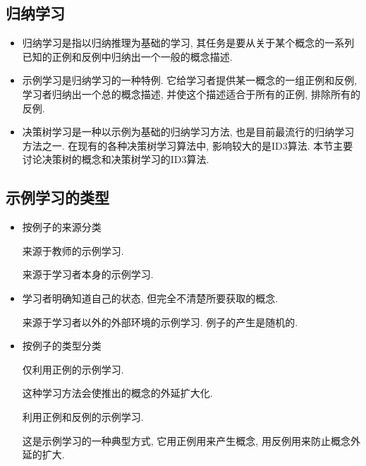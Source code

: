 \subsection{归纳学习}
\begin{itemize}
\item 归纳学习是指以归纳推理为基础的学习, 其任务是要从关于某个概念的一系列已知的正例和反例中归纳出一个一般的概念描述.
\item 示例学习是归纳学习的一种特例. 它给学习者提供某一概念的一组正例和反例, 学习者归纳出一个总的概念描述, 并使这个描述适合于所有的正例, 排除所有的反例.
\item 决策树学习是一种以示例为基础的归纳学习方法, 也是目前最流行的归纳学习方法之一. 在现有的各种决策树学习算法中, 影响较大的是ID3算法. 本节主要讨论决策树的概念和决策树学习的ID3算法.
\end{itemize}
\subsection{示例学习的类型}
\begin{itemize}
\item 按例子的来源分类

  \qquad  {} 来源于教师的示例学习.

  \qquad  {} 来源于学习者本身的示例学习.
\item 学习者明确知道自己的状态, 但完全不清楚所要获取的概念.

    \qquad  {} 来源于学习者以外的外部环境的示例学习. 例子的产生是随机的.
\item 按例子的类型分类

    \qquad  {} 仅利用正例的示例学习.

    \qquad  \qquad 这种学习方法会使推出的概念的外延扩大化.

    \qquad  {} 利用正例和反例的示例学习.

    \qquad  \qquad  这是示例学习的一种典型方式, 它用正例用来产生概念, 用反例用来防止概念外延的扩大.
\end{itemize}

